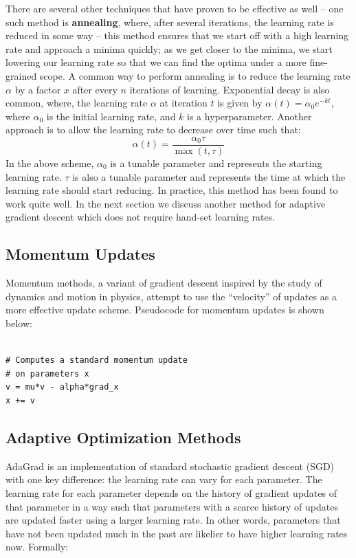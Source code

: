 \documentclass{tufte-handout}
\begin{document}
There are several other techniques that have proven to be effective as well -- one such method is \textbf{annealing}, where, after several iterations, the learning rate is reduced in some way -- this method ensures that we start off with a high learning rate and approach a minima quickly; as we get closer to the minima, we start lowering our learning rate so that we can find the optima under a more fine-grained scope. A common way to perform annealing is to reduce the learning rate $\alpha$ by a factor $x$ after every $n$ iterations of learning. Exponential decay is also common, where, the learning rate $\alpha$ at iteration $t$ is given by $\alpha(t) = \alpha_0e^{-kt}$, where $\alpha_0$ is the initial learning rate, and $k$ is a hyperparameter. Another approach is to allow the learning rate to decrease over time such that:
$$ \alpha(t) = \frac{\alpha_0\tau}{\max(t, \tau)}$$
In the above scheme, $\alpha_0$ is a tunable parameter and represents the starting learning rate. $\tau$ is also a tunable parameter and represents the time at which the learning rate should start reducing. In practice, this method has been found to work quite well. In the next section we discuss another method for adaptive gradient descent which does not require hand-set learning rates.


\subsection{Momentum Updates}

Momentum methods, a variant of gradient descent inspired by the study of dynamics and motion in physics, attempt to use the ``velocity'' of updates as a more effective update scheme. Pseudocode for momentum updates is shown below:

\begin{theorem}
\begin{verbatim}

# Computes a standard momentum update
# on parameters x
v = mu*v - alpha*grad_x
x += v
\end{verbatim}
\label{snip:momentup}
\end{theorem}


\subsection{Adaptive Optimization Methods}

AdaGrad is an implementation of standard stochastic gradient descent (SGD) with one key difference: the learning rate can vary for each parameter. The learning rate for each parameter depends on the history of gradient updates of that parameter in a way such that parameters with a scarce history of updates are updated faster using a larger learning rate. In other words, parameters that have not been updated much in the past are likelier to have higher learning rates now. Formally:
\end{document}
